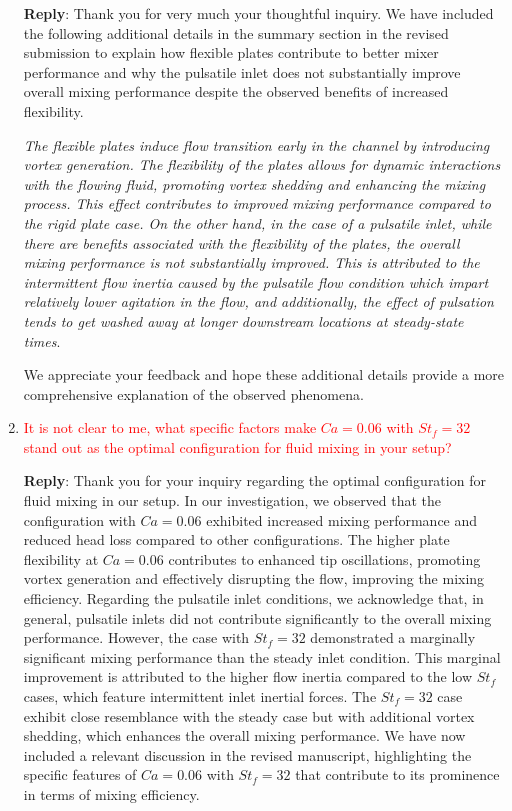 \documentclass[onecolumn,a4paper,amsmath,amssym,pre]{revtex4}
\begin{document}
\begin{enumerate}
					\textbf{Reply}: Thank you for very much your thoughtful inquiry. We have included the following additional details in the summary section in the revised submission to explain how flexible plates contribute to better mixer performance and why the pulsatile inlet does not substantially improve overall mixing performance despite the observed benefits of increased flexibility.
					
					\textit{The flexible plates induce flow transition early in the channel by introducing vortex generation. The flexibility of the plates allows for dynamic interactions with the flowing fluid, promoting vortex shedding and enhancing the mixing process. This effect contributes to improved mixing performance compared to the rigid plate case.
					On the other hand, in the case of a pulsatile inlet, while there are benefits associated with the flexibility of the plates, the overall mixing performance is not substantially improved. This is attributed to the intermittent flow inertia caused by the pulsatile flow condition which impart relatively lower agitation in the flow, and additionally, the effect of pulsation tends to get washed away at longer downstream locations at steady-state times}.
					
					We appreciate your feedback and hope these additional details provide a more comprehensive explanation of the observed phenomena. 
					
					\item \textcolor{red}{It is not clear to me, what specific factors make $Ca = 0.06$ with $St_f = 32$ stand out as the optimal configuration for fluid mixing in your setup?}
					
					\textbf{Reply}: Thank you for your inquiry regarding the optimal configuration for fluid mixing in our setup. In our investigation, we observed that the configuration with $Ca=0.06$ exhibited increased mixing performance and reduced head loss compared to other configurations. The higher plate flexibility at $Ca=0.06$ contributes to enhanced tip oscillations, promoting vortex generation and effectively disrupting the flow, improving the mixing efficiency.
					Regarding the pulsatile inlet conditions, we acknowledge that, in general, pulsatile inlets did not contribute significantly to the overall mixing performance. However, the case with $St_f=32$ demonstrated a marginally significant mixing performance than the steady inlet condition. This marginal improvement is attributed to the higher flow inertia compared to the low $St_f$ cases, which feature intermittent inlet inertial forces. The $St_f=32$ case exhibit close resemblance with the steady case but with additional vortex shedding, which enhances the overall mixing performance.			
					We have now included a relevant discussion in the revised manuscript, highlighting the specific features of $Ca=0.06$ with $St_f=32$ that contribute to its prominence in terms of mixing efficiency.
					

\end{enumerate}
\end{document}
